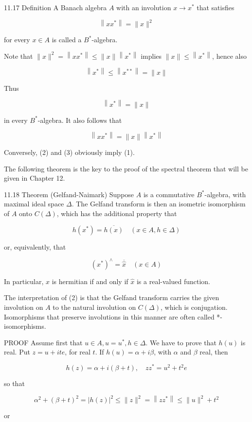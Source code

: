 \documentclass[10pt]{article}
\begin{document}
11.17 Definition A Banach algebra $A$ with an involution $x \rightarrow x^{*}$ that satisfies

$$
\left\|x x^{*}\right\|=\|x\|^{2}
$$

for every $x \in A$ is called a $B^{*}$-algebra.

Note that $\|x\|^{2}=\left\|x x^{*}\right\| \leq\|x\|\left\|x^{*}\right\|$ implies $\|x\| \leq\left\|x^{*}\right\|$, hence also

$$
\left\|x^{*}\right\| \leq\left\|x^{* *}\right\|=\|x\|
$$

Thus

$$
\left\|x^{*}\right\|=\|x\|
$$

in every $B^{*}$-algebra. It also follows that

$$
\left\|x x^{*}\right\|=\|x\|\left\|x^{*}\right\|
$$

Conversely, (2) and (3) obviously imply (1).

The following theorem is the key to the proof of the spectral theorem that will be given in Chapter 12.

11.18 Theorem (Gelfand-Naimark) Suppose $A$ is a commutative $B^{*}$-algebra, with maximal ideal space $\Delta$. The Gelfand transform is then an isometric isomorphism of $A$ onto $C(\Delta)$, which has the additional property that

$$
h\left(x^{*}\right)=\overline{h(x)} \quad(x \in A, h \in \Delta)
$$

or, equivalently, that

$$
\left(x^{*}\right)^{\wedge}=\overline{\hat{x}} \quad(x \in A)
$$

In particular, $x$ is hermitian if and only if $\hat{x}$ is a real-valued function.

The interpretation of (2) is that the Gelfand transform carries the given involution on $A$ to the natural involution on $C(\Delta)$, which is conjugation. Isomorphisms that preserve involutions in this manner are often called *-isomorphisms.

PROOF Assume first that $u \in A, u=u^{*}, h \in \Delta$. We have to prove that $h(u)$ is real. Put $z=u+i t e$, for real $t$. If $h(u)=\alpha+i \beta$, with $\alpha$ and $\beta$ real, then

$$
h(z)=\alpha+i(\beta+t), \quad z z^{*}=u^{2}+t^{2} e
$$

so that

$$
\alpha^{2}+(\beta+t)^{2}=|h(z)|^{2} \leq\|z\|^{2}=\left\|z z^{*}\right\| \leq\|u\|^{2}+t^{2}
$$

or
\end{document}
